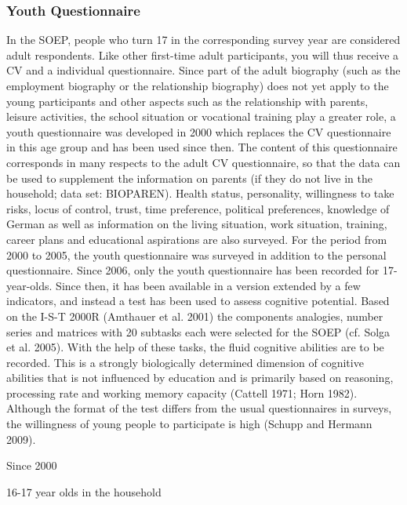\documentclass[letterpaper,10pt,openany,onesideH,english]{sphinxmanual}
\begin{document}
\subsubsection{Youth Questionnaire}
\label{\detokenize{Contents of SOEPcore/index:youth-questionnaire}}\label{\detokenize{Contents of SOEPcore/index:id27}}
In the SOEP, people who turn 17 in the corresponding survey year are considered adult respondents. Like other first-time adult participants, you will thus receive a CV and a individual questionnaire. Since part of the adult biography (such as the employment biography or the relationship biography) does not yet apply to the young participants and other aspects such as the relationship with parents, leisure activities, the school situation or vocational training play a greater role, a youth questionnaire was developed in 2000 which replaces the CV questionnaire in this age group and has been used since then. The content of this questionnaire corresponds in many respects to the adult CV questionnaire, so that the data can be used to supplement the information  on parents (if they do not live in the household; data set: BIOPAREN). Health status, personality, willingness to take risks, locus of control, trust, time preference, political preferences, knowledge of German as well as information on the living situation, work situation, training, career plans and educational aspirations are also surveyed. For the period from 2000 to 2005, the youth questionnaire was surveyed in addition to the personal questionnaire. Since 2006, only the youth questionnaire has been recorded for 17-year-olds. Since then, it has been available in a version extended by a few indicators, and instead a test has been used to assess cognitive potential. Based on the I-S-T 2000R (Amthauer et al. 2001) the components analogies, number series and matrices with 20 subtasks each were selected for the SOEP (cf. Solga et al. 2005). With the help of these tasks, the fluid cognitive abilities are to be recorded. This is a strongly biologically determined dimension of cognitive abilities that is not influenced by education and is primarily based on reasoning, processing rate and working memory capacity (Cattell 1971; Horn 1982). Although the format of the test differs from the usual questionnaires in surveys, the willingness of young people to participate is high (Schupp and Hermann 2009).

 Since 2000

 16-17 year olds in the household
\end{document}
